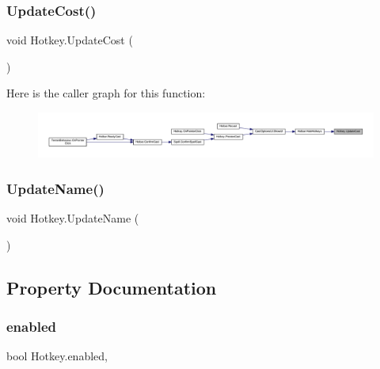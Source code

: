 \subsubsection{\texorpdfstring{UpdateCost()}{UpdateCost()}}
{\footnotesize\ttfamily void Hotkey.\+Update\+Cost (\begin{DoxyParamCaption}{ }\end{DoxyParamCaption})}

Here is the caller graph for this function\+:
\nopagebreak
\begin{figure}[H]
\begin{center}
\leavevmode
\includegraphics[width=350pt]{class_hotkey_a15822d970e7f05f8ea8ef4069a4e245a_icgraph}
\end{center}
\end{figure}
\mbox{\label{class_hotkey_a414aefec4d51bfa4b6fc68fcb8dce841}} 
\subsubsection{\texorpdfstring{UpdateName()}{UpdateName()}}
{\footnotesize\ttfamily void Hotkey.\+Update\+Name (\begin{DoxyParamCaption}{ }\end{DoxyParamCaption})}



\subsection{Property Documentation}
\mbox{\label{class_hotkey_a91d3325ffb1aa3fd83dbe59f6630b796}} 
\subsubsection{\texorpdfstring{enabled}{enabled}}
{\footnotesize\ttfamily bool Hotkey.\+enabled\hspace{0.3cm}{\ttfamily [get]}, {\ttfamily [set]}}

\mbox{\label{class_hotkey_aff210fac7bfb6cfdf469b02d6cd7e71a}} 
